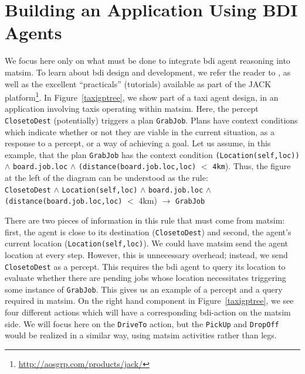 \section{Building an Application Using BDI Agents}
\label{sec:bdi-usage}
We focus here only on what must be done to integrate  \gls{bdi} agent
reasoning into \gls{matsim}. To learn about \gls{bdi} design and development, we
refer the reader to \citet{prometheusbook}, as well as the excellent
``practicals'' (tutorials) available as part of the JACK
platform\footnote{\url{http://aosgrp.com/products/jack/}}. In Figure~\ref{taxigptree}, 
we show part of a  
taxi agent design, in an application involving taxis operating
within \gls{matsim}. Here, the percept \lstinline{ClosetoDest}
(potentially) triggers a plan \lstinline{GrabJob}. Plans have context
conditions which indicate whether or not they are viable in the
current situation, as a response to a percept, or a way of achieving a
goal. Let us assume, in this example, that the plan \lstinline{GrabJob} has
the context condition \lstinline{(Location(self,loc))} $\wedge$ \lstinline{board.job.loc} $\wedge$ \lstinline{(distance(board.job.loc,loc)} $<$
\lstinline{4km}). Thus, the figure at the left of the diagram can be understood as the rule: \\
\lstinline{ClosetoDest} $\wedge$ \lstinline{Location(self,loc)} $\wedge$ \lstinline{board.job.loc} $\wedge$ \lstinline{(distance(board.job.loc,loc)} $<$ 4km) $\rightarrow$ \lstinline{GrabJob} 

There are two pieces of information in this rule that must come from
\gls{matsim}: first, the agent is close to its
destination (\lstinline{ClosetoDest}) and second, the agent's
current location (\lstinline{Location(self,loc)}).  We could have \gls{matsim}
send the agent location at every step. However, this is unnecessary
overhead; instead, we send \lstinline{ClosetoDest} as a percept. 
This requires the \gls{bdi} agent to query its location to evaluate
whether there are pending jobs whose location necessitates triggering
some instance of
 \lstinline{GrabJob}.  This gives us an
example of a percept and a query required in \gls{matsim}. On the right hand
component in Figure~\ref{taxigptree}, we see four different actions
which will have a corresponding \gls{bdi}-action on the \gls{matsim} side. We will
focus here on the \lstinline{DriveTo} action, but the \lstinline{PickUp} and
\lstinline{DropOff} would be realized in a similar way, using \gls{matsim}
activities rather than legs.

